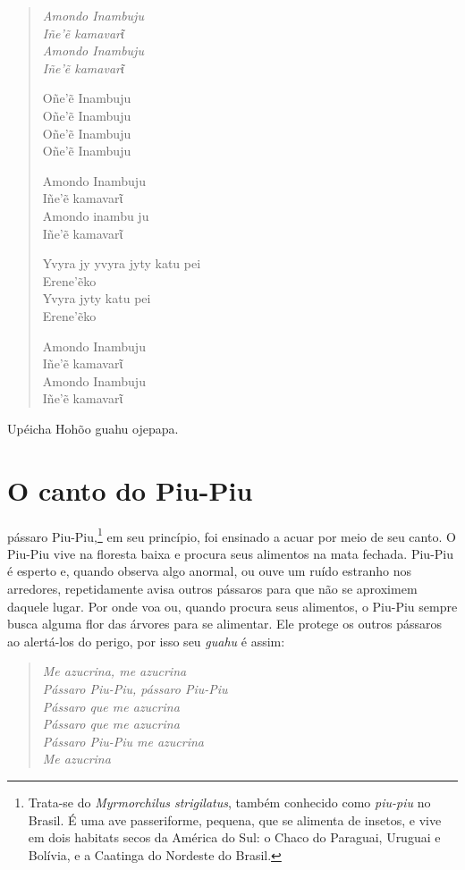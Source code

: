 \begin{verse}
\itshape
Amondo Inambuju\\
Iñe'ẽ kamavarῖ\\
Amondo Inambuju\\
Iñe'ẽ kamavarῖ

Oñe'ẽ Inambuju\\
Oñe'ẽ Inambuju\\
Oñe'ẽ Inambuju\\
Oñe'ẽ Inambuju

Amondo Inambuju\\
Iñe'ẽ kamavarῖ\\
Amondo inambu ju\\
Iñe'ẽ kamavarῖ

\pagebreak
Yvyra jy yvyra jyty katu pei\\
Erene'ẽko\\
Yvyra jyty katu pei\\
Erene'ẽko

Amondo Inambuju\\
Iñe'ẽ kamavarῖ\\
Amondo Inambuju\\
Iñe'ẽ kamavarῖ
\end{verse}

Upéicha Hohõo guahu ojepapa.

\chapter{O canto do Piu-Piu}

pássaro Piu-Piu,\footnote{Trata-se do \emph{Myrmorchilus strigilatus},
  também conhecido como \emph{piu-piu} no Brasil. É uma ave passeriforme,
  pequena, que se alimenta de insetos, e vive em dois habitats secos da
  América do Sul: o Chaco do Paraguai, Uruguai e Bolívia, e a Caatinga
  do Nordeste do Brasil.} em seu princípio, foi ensinado a acuar por
meio de seu canto. O Piu-Piu vive na floresta baixa e procura seus
alimentos na mata fechada. Piu-Piu é esperto e, quando observa algo
anormal, ou ouve um ruído estranho nos arredores, repetidamente avisa
outros pássaros para que não se aproximem daquele lugar. Por onde voa
ou, quando procura seus alimentos, o Piu-Piu sempre busca alguma flor
das árvores para se alimentar. Ele protege os outros pássaros ao
alertá-los do perigo, por isso seu \emph{guahu} é assim:

\begin{verse}
\itshape
Me azucrina, me azucrina\\
Pássaro Piu-Piu, pássaro Piu-Piu\\
Pássaro que me azucrina\\
Pássaro que me azucrina\\
Pássaro Piu-Piu me azucrina\\
Me azucrina
\end{verse}

